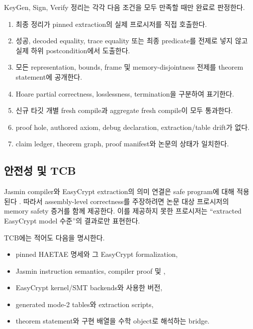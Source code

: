 \begin{acceptancecriterion}[기계검증 완료]
KeyGen, Sign, Verify 정리는 각각 다음 조건을 모두 만족할 때만 완료로 판정한다.
\begin{enumerate}
  \item 최종 정리가 pinned extraction의 실제 프로시저를 직접 호출한다.
  \item 성공, decoded equality, trace equality 또는 최종 predicate를 전제로
        넣지 않고 실제 하위 postcondition에서 도출한다.
  \item 모든 representation, bounds, frame 및 memory-disjointness 전제를
        theorem statement에 공개한다.
  \item Hoare partial correctness, losslessness, termination을 구분하여 표기한다.
  \item 신규 타깃 개별 fresh compile과 aggregate fresh 
        compile이 모두 통과한다.
  \item proof hole, authored axiom, debug declaration, extraction/table drift가 없다.
  \item claim ledger, theorem graph, proof manifest와 논문의 상태가 일치한다.
\end{enumerate}
\end{acceptancecriterion}

\subsection{안전성 및 TCB}

Jasmin compiler와 EasyCrypt extraction의 의미 연결은 safe program에 대해
적용된다 \cite{jasmin-extraction}. 따라서 assembly-level correctness를
주장하려면 논문 대상 프로시저의 memory safety 증거를 함께 제공한다. 이를
제공하지 못한 프로시저는 ``extracted EasyCrypt model 수준''의 결과로만
표현한다.

TCB에는 적어도 다음을 명시한다.

\begin{itemize}
  \item pinned HAETAE 명세와 그 EasyCrypt formalization,
  \item Jasmin instruction semantics, compiler proof 및 ,
  \item EasyCrypt kernel/SMT backends와 사용한 버전,
  \item generated mode-2 tables와 extraction scripts,
  \item theorem statement와 구현 배열을 수학 object로 해석하는 bridge.
\end{itemize}

